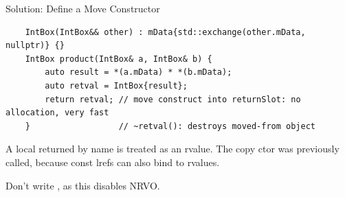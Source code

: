 \begin{frame}[fragile]{Solution: Define a Move Constructor}
  \begin{verbatim}
    IntBox(IntBox&& other) : mData{std::exchange(other.mData, nullptr)} {}
    IntBox product(IntBox& a, IntBox& b) {
        auto result = *(a.mData) * *(b.mData);
        auto retval = IntBox{result};
        return retval; // move construct into returnSlot: no allocation, very fast
    }                  // ~retval(): destroys moved-from object
  \end{verbatim}

  \begin{sqt:result}
    A local returned by name is treated as an rvalue.
    The copy ctor was previously called, because const lrefs can also bind to rvalues.
  \end{sqt:result}

  \begin{sqt:tip}
    Don't write , as this disables NRVO.
  \end{sqt:tip}
\end{frame}